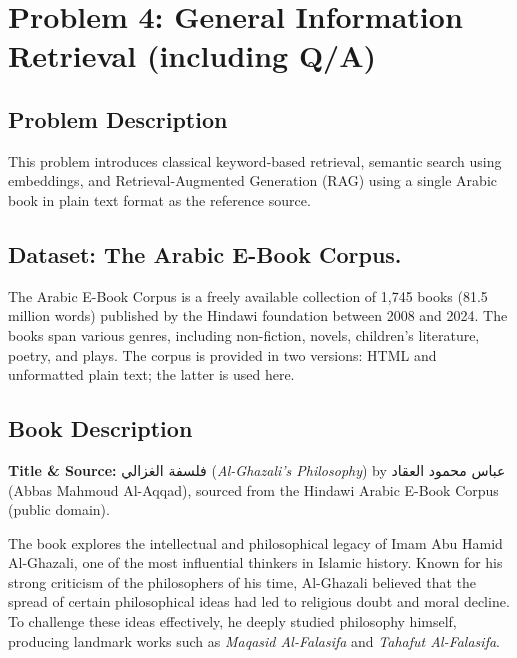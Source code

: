 
\section{Problem 4: General Information Retrieval (including Q/A)}

\subsection{Problem Description}

This problem introduces classical keyword-based retrieval, semantic search using embeddings, and Retrieval-Augmented Generation (RAG) using a single Arabic book in plain text format as the reference source.

\subsection{Dataset: The Arabic E-Book Corpus.}
The Arabic E-Book Corpus is a freely available collection of 1,745 books (81.5 million words) published by the Hindawi foundation between 2008 and 2024. The books span various genres, including non-fiction, novels, children's literature, poetry, and plays. The corpus is provided in two versions: HTML and unformatted plain text; the latter is used here.

\subsection{Book Description}

\noindent\textbf{Title \& Source:}
\textarabic{فلسفة الغزالي} (\emph{Al-Ghazali's Philosophy}) by \textarabic{عباس محمود العقاد} (Abbas Mahmoud Al-Aqqad), sourced from the Hindawi Arabic E-Book Corpus (public domain).

\medskip
The book explores the intellectual and philosophical legacy of Imam Abu Hamid Al-Ghazali, one of the most influential thinkers in Islamic history. Known for his strong criticism of the philosophers of his time, Al-Ghazali believed that the spread of certain philosophical ideas had led to religious doubt and moral decline. To challenge these ideas effectively, he deeply studied philosophy himself, producing landmark works such as \emph{Maqasid Al-Falasifa} and \emph{Tahafut Al-Falasifa}.

